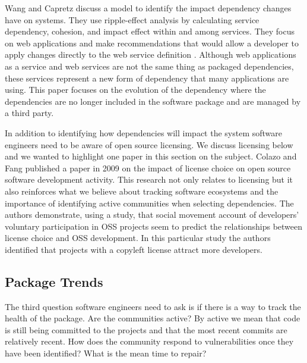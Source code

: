 \documentclass[journal]{IEEEtran}
\begin{document}
Wang and Capretz discuss a model to identify the impact dependency changes have on systems. They use ripple-effect analysis by calculating service dependency, cohesion, and impact effect within and among services. They focus on web applications and make recommendations that would allow a developer to apply changes directly to the web service definition \cite{A_Dependency_Impact_Analysis}. Although web applications as a service and web services are not the same thing as packaged dependencies, these services represent a new form of dependency that many applications are using. This paper focuses on the evolution of the dependency where the dependencies are no longer included in the software package and are managed by a third party. 

In addition to identifying how dependencies will impact the system software engineers need to be aware of open source licensing. We discuss licensing below and we wanted to highlight one paper in this section on the subject. Colazo and Fang published a paper in 2009 on the impact of license choice on open source software development activity. This research not only relates to licensing but it also reinforces what we believe about tracking software ecosystems and the importance of identifying active communities when selecting dependencies. The authors demonstrate, using a study, that social movement account of developers' voluntary participation in OSS projects seem to predict the relationships between license choice and OSS development. In this particular study the authors identified that projects with a copyleft license attract more developers\cite{Colazo_Fang_2009}. 

\subsection{Package Trends}
The third question software engineers need to ask is if there is a way to track the health of the package. Are the communities active? By active we mean that code is still being committed to the projects and that the most recent commits are relatively recent. How does the community respond to vulnerabilities once they have been identified? What is the mean time to repair?
\end{document}
